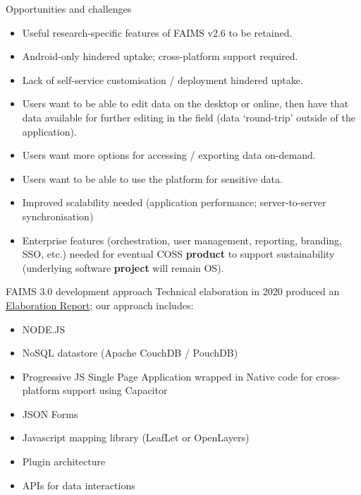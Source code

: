 \documentclass[aspectratio=169, 12pt]{beamer} %
\begin{document}
\begin{frame}{Opportunities and challenges}
    \begin{itemize}[label=\textbullet]
        \item Useful research-specific features of FAIMS v2.6 to be retained.
        \item Android-only hindered uptake; cross-platform support required.
        \item Lack of self-service customisation / deployment hindered uptake.
        \item Users want to be able to edit data on the desktop or online, then have that data available for further editing in the field (data `round-trip' outside of the application).
        \item Users want more options for accessing / exporting data on-demand.
        \item Users want to be able to use the platform for sensitive data. 
        \item Improved scalability needed (application performance; server-to-server synchronisation)
        \item Enterprise features (orchestration, user management, reporting, branding, SSO, etc.) needed for eventual COSS \textbf{product} to support sustainability (underlying software \textbf{project} will remain OS).
    \end{itemize}
\end{frame}

\begin{frame}{FAIMS 3.0 development approach}
Technical elaboration in 2020 produced an \href{https://zenodo.org/record/4616766}{Elaboration Report}; our approach includes:
    \begin{itemize}[label=\textbullet]
        \item NODE.JS
        \item NoSQL datastore (Apache CouchDB / PouchDB)
        \item Progressive JS Single Page Application wrapped in Native code
for cross-platform support using Capacitor
        \item JSON Forms
        \item Javascript mapping library (LeafLet or OpenLayers)
        \item Plugin architecture
        \item APIs for data interactions

    \end{itemize}
\end{frame}
\end{document}
